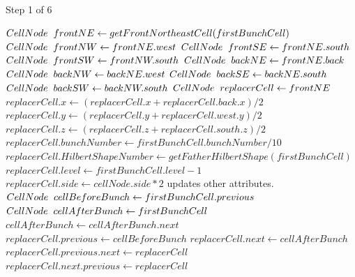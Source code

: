 \begin{algorithm}[!ht]
    \caption{Step 1 of 6}
    \small{
    \begin{algorithmic}[1]
        \State $CellNode \hspace{2mm} frontNE \gets getFrontNortheastCell(firstBunchCell)$
        \State $CellNode \hspace{2mm} frontNW \gets frontNE.west$
        \State $CellNode \hspace{2mm} frontSE \gets frontNE.south$
        \State $CellNode \hspace{2mm} frontSW \gets frontNW.south$
        \State $CellNode \hspace{2mm} backNE \gets frontNE.back$
        \State $CellNode \hspace{2mm} backNW \gets backNE.west$
        \State $CellNode \hspace{2mm} backSE \gets backNE.south$
        \State $CellNode \hspace{2mm} backSW \gets backNW.south$
        \State
        \State $CellNode\hspace{2mm} replacerCell \gets frontNE$
        \State $replacerCell.x \gets (replacerCell.x + replacerCell.back.x) / 2$
        \State $replacerCell.y \gets (replacerCell.y + replacerCell.west.y) / 2$
        \State $replacerCell.z \gets (replacerCell.z + replacerCell.south.z) / 2$
        \State $replacerCell.bunchNumber \gets firstBunchCell.bunchNumber / 10$
        \State $replacerCell.HilbertShapeNumber \gets getFatherHilbertShape(firstBunchCell)$
        \State $replacerCell.level \gets firstBunchCell.level - 1$
        \State $replacerCell.side \gets cellNode.side * 2$
        \State updates other attributes.
        \State
        \State $CellNode\hspace{2mm} cellBeforeBunch \gets firstBunchCell.previous$
        \State $CellNode\hspace{2mm} cellAfterBunch \gets firstBunchCell$
            \State $cellAfterBunch \gets cellAfterBunch.next$
        \EndFor
        \State $replacerCell.previous \gets cellBeforeBunch$
        \State $replacerCell.next \gets cellAfterBunch$
            \State $replacerCell.previous.next \gets replacerCell$
        \EndIf
            \State $replacerCell.next.previous \gets replacerCell$
        \EndIf
    \end{algorithmic}
    }
    \label{STEP_1_DEREFINEMENT}
\end{algorithm}

